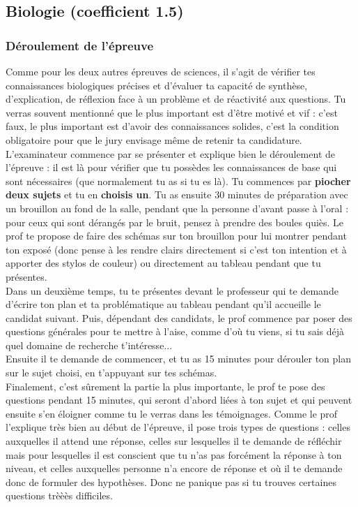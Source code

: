 \subsection{Biologie (coefficient 1.5)}

\subsubsection{Déroulement de l'épreuve}

Comme pour les deux autres épreuves de sciences, il s’agit de vérifier tes connaissances biologiques précises et d’évaluer ta capacité de synthèse, d’explication, de réflexion face à un problème et de réactivité aux questions. Tu verras souvent mentionné que le plus important est d’être motivé et vif : c’est faux, le plus important est d’avoir des connaissances solides, c’est la condition obligatoire pour que le jury envisage même de retenir ta candidature.\\

L’examinateur commence par se présenter et explique bien le déroulement de l’épreuve : il est là pour vérifier que tu possèdes les connaissances de base qui sont nécessaires (que normalement tu as si tu es là). Tu commences par \textbf{piocher deux sujets} et tu en \textbf{choisis un}. Tu as ensuite 30 minutes de préparation avec un brouillon au fond de la salle, pendant que la personne d’avant passe à l’oral : pour ceux qui sont dérangés par le bruit, pensez à prendre des boules quiès. Le prof te propose de faire des schémas sur ton brouillon pour lui montrer pendant ton exposé (donc pense à les rendre clairs directement si c’est ton intention et à apporter des stylos de couleur) ou directement au tableau pendant que tu présentes.\\

Dans un deuxième temps, tu te présentes devant le professeur qui te demande d’écrire ton plan et ta problématique au tableau pendant qu’il accueille le candidat suivant. Puis, dépendant des candidats, le prof commence par poser des questions générales pour te mettre à l’aise, comme d’où tu viens, si tu sais déjà quel domaine de recherche t'intéresse... \\

Ensuite il te demande de commencer, et tu as 15 minutes pour dérouler ton plan sur le sujet choisi, en t'appuyant sur tes schémas.\\

Finalement, c’est sûrement la partie la plus importante, le prof te pose des questions pendant 15 minutes, qui seront d’abord liées à ton sujet et qui peuvent ensuite s’en éloigner comme tu le verras dans les témoignages. Comme le prof l’explique très bien au début de l’épreuve, il pose trois types de questions : celles auxquelles il attend une réponse, celles sur lesquelles il te demande de réfléchir mais pour lesquelles il est conscient que tu n’as pas forcément la réponse à ton niveau, et celles auxquelles personne n’a encore de réponse et où il te demande donc de formuler des hypothèses. Donc ne panique pas si tu trouves certaines questions trèèès difficiles.\\

